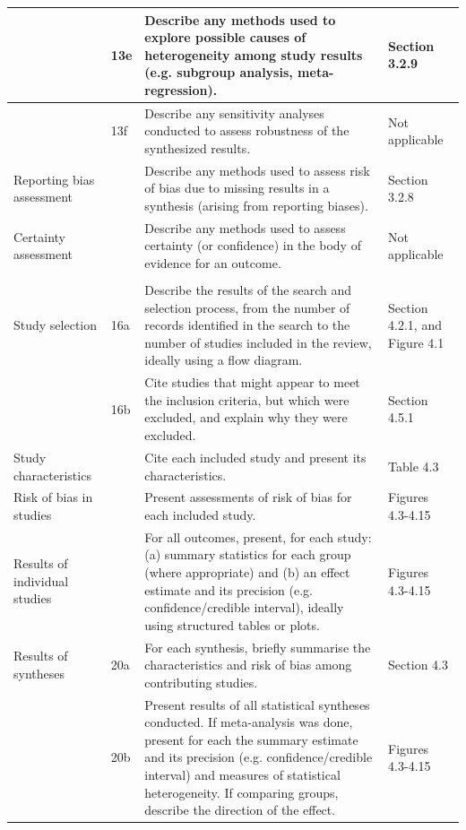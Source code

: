\documentclass[a4paper, twoside]{templates/ociamthesis}
\begin{document}
\begin{longtable}[t]{>{\raggedright\arraybackslash}p{8.45em}>{\centering\arraybackslash}p{2.1em}>{\raggedright\arraybackslash}p{13.5em}>{\raggedright\arraybackslash}p{7.45em}}
\midrule
\addlinespace
 & 13e & Describe any methods used to explore possible causes of heterogeneity among study results (e.g. subgroup analysis, meta-regression). & Section 3.2.9\\
\midrule
\addlinespace
 & 13f & Describe any sensitivity analyses conducted to assess robustness of the synthesized results. & Not applicable\\
\midrule
\addlinespace
Reporting bias assessment & 14 & Describe any methods used to assess risk of bias due to missing results in a synthesis (arising from reporting biases). & Section 3.2.8\\
\midrule
\addlinespace
Certainty assessment & 15 & Describe any methods used to assess certainty (or confidence) in the body of evidence for an outcome. & Not applicable\\
\midrule
\addlinespace
\cellcolor[HTML]{FFFFCC}{\textbf{RESULTS}} & \cellcolor[HTML]{FFFFCC}{\textbf{}} & \cellcolor[HTML]{FFFFCC}{\textbf{}} & \cellcolor[HTML]{FFFFCC}{\textbf{}}\\
\midrule
\addlinespace
Study selection & 16a & Describe the results of the search and selection process, from the number of records identified in the search to the number of studies included in the review, ideally using a flow diagram. & Section 4.2.1, and Figure 4.1\\
\midrule
\addlinespace
 & 16b & Cite studies that might appear to meet the inclusion criteria, but which were excluded, and explain why they were excluded. & Section 4.5.1\\
\midrule
\addlinespace
Study characteristics & 17 & Cite each included study and present its characteristics. & Table 4.3\\
\midrule
\addlinespace
Risk of bias in studies & 18 & Present assessments of risk of bias for each included study. & Figures 4.3-4.15\\
\midrule
\addlinespace
Results of individual studies & 19 & For all outcomes, present, for each study: (a) summary statistics for each group (where appropriate) and (b) an effect estimate and its precision (e.g. confidence/credible interval), ideally using structured tables or plots. & Figures 4.3-4.15\\
\midrule
\addlinespace
Results of syntheses & 20a & For each synthesis, briefly summarise the characteristics and risk of bias among contributing studies. & Section 4.3\\
\midrule
\addlinespace
 & 20b & Present results of all statistical syntheses conducted. If meta-analysis was done, present for each the summary estimate and its precision (e.g. confidence/credible interval) and measures of statistical heterogeneity. If comparing groups, describe the direction of the effect. & Figures 4.3-4.15\\

\end{longtable}
\end{document}
